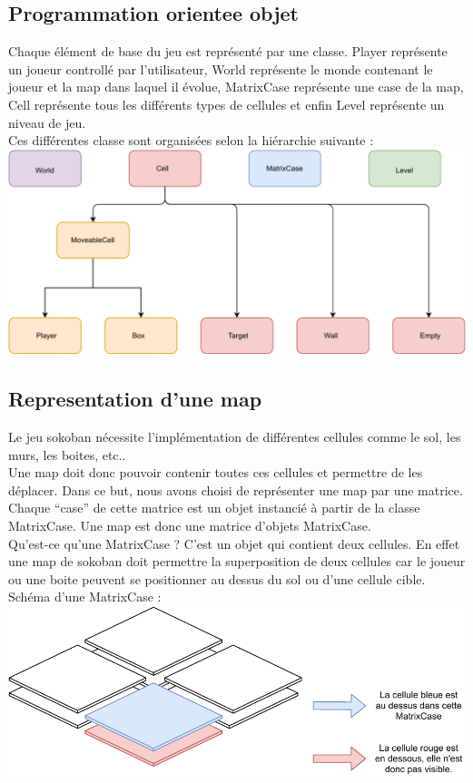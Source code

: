 \documentclass[../main.tex]{subfiles}
\begin{document}
\subsection{Programmation orientee objet}
Chaque élément de base du jeu est représenté par une classe. Player représente un joueur controllé par l'utilisateur, World représente le monde contenant le joueur et la map dans laquel il évolue, MatrixCase représente une case de la map, Cell représente tous les différents types de cellules et enfin Level représente un niveau de jeu.\\
Ces différentes classe sont organisées selon la hiérarchie suivante :\\

\includegraphics[width=1\textwidth,clip]{images/objects.pdf}

\subsection{Representation d'une map}
Le jeu sokoban nécessite l'implémentation de différentes cellules comme le sol, les murs, les boites, etc.. \\
Une map doit donc pouvoir contenir toutes ces cellules et permettre de les déplacer. Dans ce but, nous avons choisi de représenter une map
par une matrice. Chaque ``case'' de cette matrice est un objet instancié à partir de la classe MatrixCase. Une map est donc une matrice d'objets MatrixCase.\\
Qu'est-ce qu'une MatrixCase ? C'est un objet qui contient deux cellules. En effet une map de sokoban doit permettre la superposition de deux cellules car le joueur ou une boite peuvent se positionner au dessus du sol ou d'une cellule cible.
Schéma d'une MatrixCase :\\

\includegraphics[width=1\textwidth,clip]{images/matrixCase.pdf}
\end{document}
